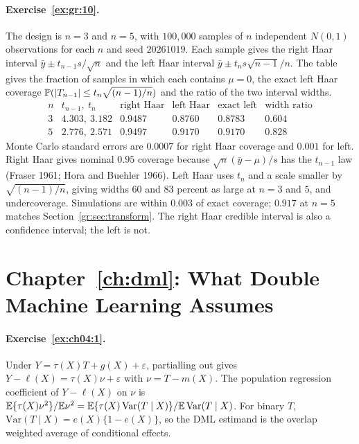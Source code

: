 \paragraph{Exercise~\ref{ex:gr:10}.} The design is $n=3$ and $n=5$, with $100{,}000$ samples of $n$ independent $N(0,1)$ observations for each $n$ and seed $20261019$. Each sample gives the right Haar interval $\bar y\pm t_{n-1}s/\sqrt n$ and the left Haar interval $\bar y\pm t_ns\sqrt{n-1}/n$. The table gives the fraction of samples in which each contains $\mu=0$, the exact left Haar coverage $\mathbb{P}(|T_{n-1}|\le t_n\sqrt{(n-1)/n})$ and the ratio of the two interval widths.
\[
\begin{array}{cccccc}
n & t_{n-1},\ t_n & \text{right Haar} & \text{left Haar} & \text{exact left} & \text{width ratio}\\
3 & 4.303,\ 3.182 & 0.9487 & 0.8760 & 0.8783 & 0.604\\
5 & 2.776,\ 2.571 & 0.9497 & 0.9170 & 0.9170 & 0.828
\end{array}
\]
Monte Carlo standard errors are $0.0007$ for right Haar coverage and $0.001$ for left. Right Haar gives nominal $0.95$ coverage because $\sqrt n(\bar y-\mu)/s$ has the $t_{n-1}$ law (Fraser 1961; Hora and Buehler 1966). Left Haar uses $t_n$ and a scale smaller by $\sqrt{(n-1)/n}$, giving widths $60$ and $83$ percent as large at $n=3$ and $5$, and undercoverage. Simulations are within $0.003$ of exact coverage; $0.917$ at $n=5$ matches Section~\ref{gr:sec:transform}. The right Haar credible interval is also a confidence interval; the left is not.

\section*{Chapter~\ref{ch:dml}: What Double Machine Learning Assumes}

\paragraph{Exercise~\ref{ex:ch04:1}.} Under $Y = \tau(X)T + g(X) + \varepsilon$, partialling out gives $Y - \ell(X) = \tau(X)\nu + \varepsilon$ with $\nu = T - m(X)$. The population regression coefficient of $Y - \ell(X)$ on $\nu$ is $\mathbb{E}\{\tau(X)\nu^2\}/\mathbb{E}\nu^2 = \mathbb{E}\{\tau(X)\,\mathrm{Var}(T \mid X)\}/\mathbb{E}\,\mathrm{Var}(T \mid X)$. For binary $T$, $\mathrm{Var}(T \mid X) = e(X)\{1 - e(X)\}$, so the DML estimand is the overlap weighted average of conditional effects.

